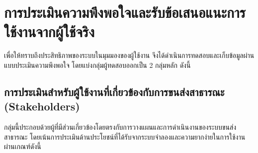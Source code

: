 \section{การประเมินความพึงพอใจและรับข้อเสนอแนะการใช้งานจากผู้ใช้จริง}
\begin{mypara}
    \indent เพื่อให้ทราบถึงประสิทธิภาพของระบบในมุมมองของผู้ใช้งาน จึงได้ดำเนินการทดสอบและเก็บข้อมูลผ่านแบบประเมินความพึงพอใจ
     โดยแบ่งกลุ่มผู้ทดสอบออกเป็น 2 กลุ่มหลัก ดังนี้

\end{mypara}

\subsection{การประเมินสำหรับผู้ใช้งานที่เกี่ยวข้องกับการขนส่งสาธารณะ (Stakeholders)}
\begin{mypara}
    \indent กลุ่มนี้ประกอบด้วยผู้ที่มีส่วนเกี่ยวข้องโดยตรงกับการวางแผนและการดำเนินงานของระบบขนส่งสาธารณะ 
    โดยเน้นการประเมินด้านประโยชน์ที่ได้รับจากระบบจำลองและความยากง่ายในการใช้งานผ่านเกณฑ์ดังนี้    
\end{mypara}

